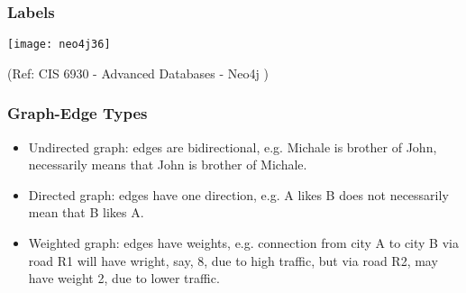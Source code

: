 \begin{frame}\frametitle{Labels}


\begin{center}
\texttt{[image: neo4j36]}
\end{center}	

{\tiny (Ref: CIS 6930 - Advanced Databases - Neo4j )}
\end{frame}


\begin{frame}[fragile]\frametitle{Graph-Edge Types}

\begin{itemize}
\item Undirected graph: edges are bidirectional, e.g. Michale is brother of John, necessarily means that John is brother of Michale.
\item Directed graph: edges have one direction, e.g. A likes B does not necessarily mean that B likes A.
\item Weighted graph: edges have weights, e.g. connection from city A to city B via road R1 will have wright, say, 8, due to high traffic, but via road R2, may have weight 2, due to lower traffic.
\end{itemize}

\end{frame}




 



 

